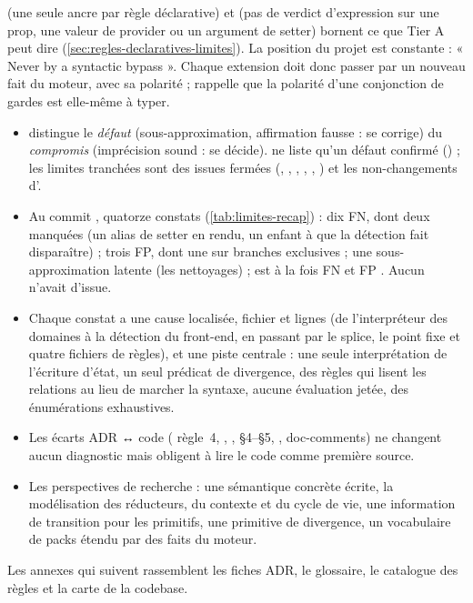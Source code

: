  (une seule ancre par règle déclarative) et  (pas de verdict d'expression sur une prop, une valeur de provider ou un argument de setter) bornent ce que Tier A peut dire (\cref{sec:regles-declaratives-limites}). La position du projet est constante : « Never by a syntactic bypass ». Chaque extension doit donc passer par un nouveau fait du moteur, avec sa polarité ;  rappelle que la polarité d'une conjonction de gardes est elle-même à typer.

\begin{resume}
\begin{itemize}
\item \reactant{} distingue le \emph{défaut} (sous-approximation, affirmation fausse : se corrige) du \emph{compromis} (imprécision sound : se décide).  ne liste qu'un défaut confirmé () ; les limites tranchées sont des issues fermées  (, , , , , ) et les non-changements d'.
\item Au commit \snapshotCommit{}, quatorze constats (\cref{tab:limites-recap}) : dix FN, dont deux \Error{} manquées (un alias de setter en rendu, un enfant à  que la détection fait disparaître) ; trois FP, dont une \Error{} sur branches exclusives ; une sous-approximation latente (les nettoyages) ;  est à la fois FN et FP \Error{}. Aucun n'avait d'issue.
\item Chaque constat a une cause localisée, fichier et lignes (de l'interpréteur des domaines à la détection du front-end, en passant par le splice, le point fixe et quatre fichiers de règles), et une piste centrale : une seule interprétation de l'écriture d'état, un seul prédicat de divergence, des règles qui lisent les relations au lieu de marcher la syntaxe, aucune évaluation jetée, des énumérations exhaustives.
\item Les écarts ADR ↔ code ( règle~4, , ,  §4--§5, , doc-comments) ne changent aucun diagnostic mais obligent à lire le code comme première source.
\item Les perspectives de recherche : une sémantique concrète écrite, la modélisation des réducteurs, du contexte et du cycle de vie, une information de transition pour les primitifs, une primitive  de divergence, un vocabulaire de packs étendu par des faits du moteur.
\end{itemize}
Les annexes qui suivent rassemblent les fiches ADR, le glossaire, le catalogue des règles et la carte de la codebase.
\end{resume}

